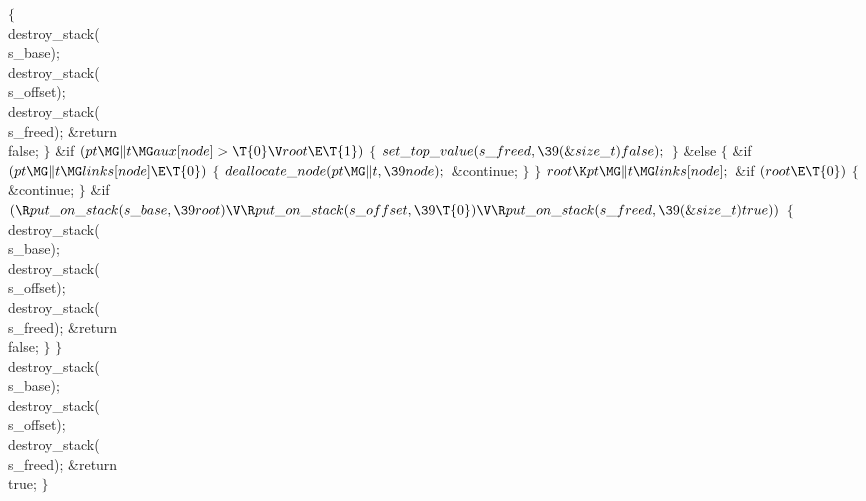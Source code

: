 ${}\{{}$\1\6
\\{destroy\_stack}(\\{s\_base});\6
\\{destroy\_stack}(\\{s\_offset});\6
\\{destroy\_stack}(\\{s\_freed});\6
\&{return} \\{false};\6
\4${}\}{}$\2\6
\&{if} ${}(\\{pt}\MG\|t\MG\\{aux}[\\{node}]>\T{0}\V\\{root}\E\T{1}){}$\5
${}\{{}$\1\6
${}\\{set\_top\_value}(\\{s\_freed},\39(\&{size\_t})\,\\{false});{}$\6
\4${}\}{}$\2\6
\&{else}\5
${}\{{}$\1\6
\&{if} ${}(\\{pt}\MG\|t\MG\\{links}[\\{node}]\E\T{0}){}$\5
${}\{{}$\1\6
${}\\{deallocate\_node}(\\{pt}\MG\|t,\39\\{node});{}$\6
\&{continue};\6
\4${}\}{}$\2\6
\4${}\}{}$\2\6
${}\\{root}\K\\{pt}\MG\|t\MG\\{links}[\\{node}];{}$\6
\&{if} ${}(\\{root}\E\T{0}){}$\5
${}\{{}$\1\6
\&{continue};\6
\4${}\}{}$\2\6
\&{if} ${}(\R\\{put\_on\_stack}(\\{s\_base},\39\\{root})\V\R\\{put\_on\_stack}(%
\\{s\_offset},\39\T{0})\V\R\\{put\_on\_stack}(\\{s\_freed},\39(\&{size\_t})\,%
\\{true})){}$\5
${}\{{}$\1\6
\\{destroy\_stack}(\\{s\_base});\6
\\{destroy\_stack}(\\{s\_offset});\6
\\{destroy\_stack}(\\{s\_freed});\6
\&{return} \\{false};\6
\4${}\}{}$\2\6
\4${}\}{}$\2\6
\\{destroy\_stack}(\\{s\_base});\6
\\{destroy\_stack}(\\{s\_offset});\6
\\{destroy\_stack}(\\{s\_freed});\6
\&{return} \\{true};\6
\4${}\}{}$\2\par
\fi

